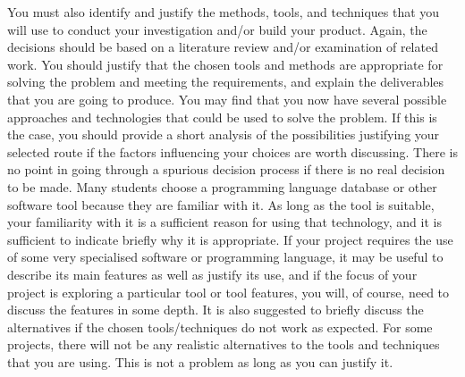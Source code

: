 {    You must also identify and justify the methods, tools, and techniques that you will use to conduct your investigation and/or build your product. Again, the decisions
    should be based on a literature review and/or examination of related work. You should justify that the chosen tools and methods are appropriate for solving the problem
    and meeting the requirements, and explain the deliverables that you are going to produce.
    You may find that you now have several possible approaches and technologies that could be used to solve the problem. If this is the case, you should provide a short
    analysis of the possibilities justifying your selected route if the factors influencing your choices are worth discussing. There is no point in going through a spurious
    decision process if there is no real decision to be made. Many students choose a programming language database or other software tool because they are familiar with it.
    As long as the tool is suitable, your familiarity with it is a sufficient reason for using that technology, and it is sufficient to indicate briefly why it is appropriate.
    If your project requires the use of some very specialised software or programming language, it may be useful to describe its main features as well as justify its use,
    and if the focus of your project is exploring a particular tool or tool features, you will, of course, need to discuss the features in some depth. It is also suggested
    to briefly discuss the alternatives if the chosen tools/techniques do not work as expected. For some projects, there will not be any realistic alternatives to the tools
    and techniques that you are using. This is not a problem as long as you can justify it.
}
